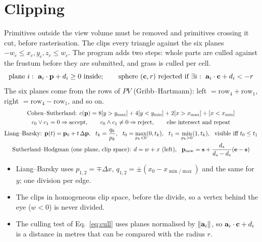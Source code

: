\section{Clipping}
\label{sec:clip}
Primitives outside the view volume must be removed and primitives crossing it cut, before rasterisation.
The  clips every triangle against the six planes $-w_c\le x_c,y_c,z_c\le w_c$. The program adds two  steps:
whole parts are culled against the frustum before they are submitted, and grass is culled per cell.
\begin{equation}
\text{plane } i:\ \vect a_i\cdot\vect p+d_i\ge0\ \text{inside};\qquad
\text{sphere }(\vect c,r)\ \text{rejected if}\ \exists i:\ \vect a_i\cdot\vect c+d_i<-r
\label{eq:cull}
\end{equation}
The six planes come from the rows of $PV$ (Gribb--Hartmann): left $=\text{row}_4+\text{row}_1$, right $=\text{row}_4-\text{row}_1$, and so on.
\begin{gather}
\text{Cohen--Sutherland: }c(\vect p)=8[y>y_{\max}]+4[y<y_{\min}]+2[x>x_{\max}]+[x<x_{\min}]\nonumber\\
c_0\lor c_1=0\Rightarrow\text{accept},\qquad c_0\land c_1\ne0\Rightarrow\text{reject},\qquad\text{else intersect and repeat}\nonumber\\
\text{Liang--Barsky: }\vect p(t)=\vect p_0+t\,\Delta\vect p,\ \ t_k=\frac{q_k}{p_k},\ \ t_0=\max_{p_k<0}(0,t_k),\ \ t_1=\min_{p_k>0}(1,t_k),\ \ \text{visible iff } t_0\le t_1\label{eq:clipalgs}\\
\text{Sutherland--Hodgman (one plane, clip space): }d=w+x\ \text{(left)},\ \ \vect p_{\text{new}}=\vect s+\frac{d_s}{d_s-d_e}(\vect e-\vect s)\nonumber
\end{gather}
\begin{itemize}
\item Liang--Barsky uses $p_{1,2}=\mp\Delta x$, $q_{1,2}=\pm(x_0-x_{\min/\max})$ and the same for $y$; one division per edge.
\item The  clips in homogeneous clip space, before the divide, so a vertex behind the eye ($w<0$) is never divided.
\item The  culling test of Eq.~\eqref{eq:cull} uses planes normalised by $\lVert\mathbf{a}_i\rVert$, so $\mathbf{a}_i\cdot\mathbf{c}+d_i$ is a
distance in metres that can be compared with the radius $r$.
\end{itemize}

